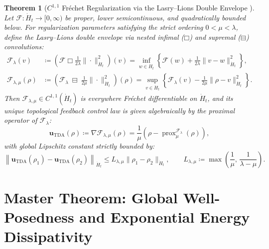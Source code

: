 \documentclass[11pt,a4paper,reqno]{article}
\renewcommand{\Box}{\mdlgwhtsquare}
\newtheorem{theorem}{Theorem}[section]
\theoremstyle{definition}
\theoremstyle{remark}
\begin{document}
\begin{theorem}[$C^{1,1}$ Fr\'echet Regularization via the Lasry--Lions Double Envelope \cite{lasry1986remarks, attouch1993approximation, ananda2026stochastic_fluid_v2}]\label{thm:lasry_lions}
Let $\mathcal{F} : \dot{H}_t \to [0, \infty)$ be proper, lower semicontinuous, and quadratically bounded below. For regularization parameters satisfying the strict ordering $0 < \mu < \lambda$, define the Lasry--Lions double envelope via nested infimal ($\Box$) and supremal ($\boxminus$) convolutions:
\begin{align}\label{eq:lasry_lions_def}
  \mathcal{F}_\lambda(v) &\coloneqq \left(\mathcal{F} \;\Box\; \frac{1}{2\lambda}\|\cdot\|_{\dot{H}_t}^2\right)(v) = \inf_{w \in \dot{H}_t} \left\{ \mathcal{F}(w) + \frac{1}{2\lambda}\|v - w\|_{\dot{H}_t}^2 \right\}, \\
  \mathcal{F}_{\lambda,\mu}(\rho) &\coloneqq \left(\mathcal{F}_\lambda \;\boxminus\; \frac{1}{2\mu}\|\cdot\|_{\dot{H}_t}^2\right)(\rho) = \sup_{v \in \dot{H}_t} \left\{ \mathcal{F}_\lambda(v) - \frac{1}{2\mu}\|\rho - v\|_{\dot{H}_t}^2 \right\}.
\end{align}
Then $\mathcal{F}_{\lambda,\mu} \in C^{1,1}(\dot{H}_t)$ is everywhere Fr\'echet differentiable on $\dot{H}_t$, and its unique topological feedback control law is given algebraically by the proximal operator of $\mathcal{F}_\lambda$:
\begin{equation}\label{eq:lasry_lions_grad}
  \mathbf{u}_{\mathrm{TDA}}(\rho) \coloneqq \nabla \mathcal{F}_{\lambda,\mu}(\rho) = \frac{1}{\mu}\left( \rho - \operatorname{prox}_{\mu}^{\mathcal{F}_\lambda}(\rho) \right),
\end{equation}
with global Lipschitz constant strictly bounded by:
\begin{equation}\label{eq:lasry_lipschitz_bound}
  \left\| \mathbf{u}_{\mathrm{TDA}}(\rho_1) - \mathbf{u}_{\mathrm{TDA}}(\rho_2) \right\|_{\dot{H}_t} \le L_{\lambda,\mu} \|\rho_1 - \rho_2\|_{\dot{H}_t}, \qquad L_{\lambda,\mu} \coloneqq \max\!\left(\frac{1}{\mu},\, \frac{1}{\lambda - \mu}\right).
\end{equation}
\end{theorem}

\section{Master Theorem: Global Well-Posedness and Exponential Energy Dissipativity}
\end{document}

